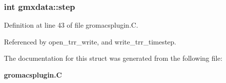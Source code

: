 \subsubsection{\setlength{\rightskip}{0pt plus 5cm}int gmxdata::step}\label{structgmxdata_m2}




Definition at line 43 of file gromacsplugin.C.

Referenced by open\_\-trr\_\-write, and write\_\-trr\_\-timestep.

The documentation for this struct was generated from the following file:\begin{CompactItemize}
\item 
{\bf gromacsplugin.C}\end{CompactItemize}
